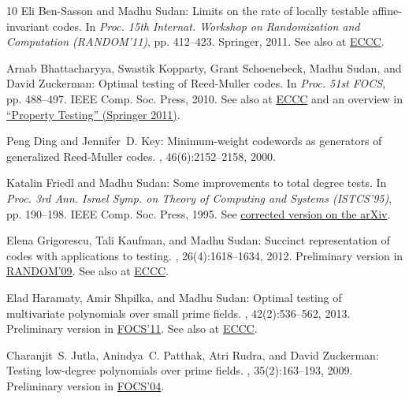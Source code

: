 \begin{thebibliography}{10}
{\sc Eli {Ben-Sasson} and Madhu Sudan}: Limits on the rate of locally testable
  affine-invariant codes.
\newblock In {\em Proc. 15th Internat. Workshop on Randomization and
  Computation (RANDOM'11)}, pp. 412--423. Springer, 2011.
\newblock See also at \href{http://eccc.hpi-web.de/report/2010/108/}{ECCC}.
\newblock [\epfmtdoi{10.1007/978-3-642-22935-0\_35}]

{\sc Arnab Bhattacharyya, Swastik Kopparty, Grant Schoenebeck, Madhu Sudan, and
  David Zuckerman}: Optimal testing of {Reed-Muller} codes.
\newblock In {\em Proc. 51st FOCS}, pp. 488--497. IEEE Comp. Soc. Press, 2010.
\newblock See also at \href{http://eccc.hpi-web.de/report/2009/086/}{ECCC} and
  an overview in
  \href{http://dx.doi.org/10.1007/978-3-642-16367-8\_19}{``Property Testing''
  (Springer 2011)}.

{\sc Peng Ding and Jennifer~D. Key}: Minimum-weight codewords as generators of
  generalized {Reed-Muller} codes.
, 46(6):2152--2158, 2000.
\newblock [\epfmtdoi{10.1109/18.868484}]

{\sc Katalin Friedl and Madhu Sudan}: Some improvements to total degree tests.
\newblock In {\em Proc. 3rd Ann. Israel Symp. on Theory of Computing and
  Systems (ISTCS'95)}, pp. 190--198. IEEE Comp. Soc. Press, 1995.
\newblock See \href{http://arxiv.org/abs/1307.3975}{corrected version on the
  arXiv}.

{\sc Elena Grigorescu, Tali Kaufman, and Madhu Sudan}: Succinct representation
  of codes with applications to testing.
, 26(4):1618--1634, 2012.
\newblock Preliminary version in
  \href{http://dx.doi.org/10.1007/978-3-642-03685-9_40}{RANDOM'09}. See also at
  \href{http://eccc.hpi-web.de/report/2009/043/}{ECCC}.
\newblock [\epfmtdoi{10.1137/100818364}]

{\sc Elad Haramaty, Amir Shpilka, and Madhu Sudan}: Optimal testing of
  multivariate polynomials over small prime fields.
, 42(2):536--562, 2013.
\newblock Preliminary version in
  \href{http://dx.doi.org/10.1109/FOCS.2011.61}{FOCS'11}. See also at
  \href{http://eccc.hpi-web.de/report/2011/059/}{ECCC}.
\newblock [\epfmtdoi{10.1137/120879257}]

{\sc Charanjit~S. Jutla, Anindya~C. Patthak, Atri Rudra, and David Zuckerman}:
  Testing low-degree polynomials over prime fields.
, 35(2):163--193, 2009.
\newblock Preliminary version in
  \href{http://dx.doi.org/10.1109/FOCS.2004.64}{FOCS'04}.


\end{thebibliography}
